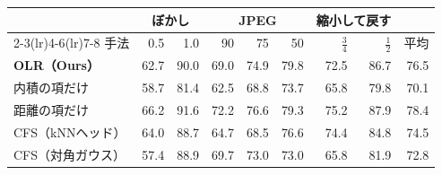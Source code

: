 \documentclass[border=3pt]{standalone}
\begin{document}
%
\begin{tabular}{l*{7}{r}r}%
\toprule
 & \multicolumn{2}{c}{ぼかし} & \multicolumn{3}{c}{JPEG} & \multicolumn{2}{c}{縮小して戻す} & \\
\cmidrule(lr){2-3}\cmidrule(lr){4-6}\cmidrule(lr){7-8}
手法 & 0.5 & 1.0 & 90 & 75 & 50 & $\frac{3}{4}$ & $\frac{1}{2}$ & 平均\\
\midrule
\textbf{OLR（Ours）} & 62.7 & 90.0 & 69.0 & 74.9 & 79.8 & 72.5 & 86.7 & 76.5\\
\quad  内積の項だけ & 58.7 & 81.4 & 62.5 & 68.8 & 73.7 & 65.8 & 79.8 & 70.1\\
\quad  距離の項だけ & 66.2 & 91.6 & 72.2 & 76.6 & 79.3 & 75.2 & 87.9 & 78.4\\
\midrule
CFS（kNNヘッド） & 64.0 & 88.7 & 64.7 & 68.5 & 76.6 & 74.4 & 84.8 & 74.5\\
CFS（対角ガウス） & 57.4 & 88.9 & 69.7 & 73.0 & 73.0 & 65.8 & 81.9 & 72.8\\
\bottomrule
\end{tabular}%
\end{document}
